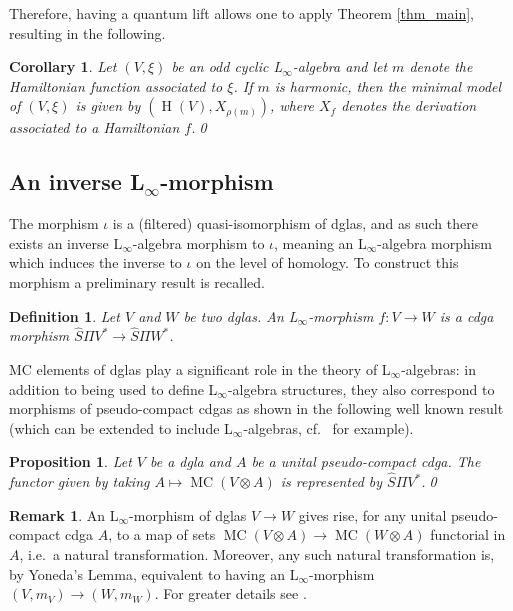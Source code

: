 \documentclass[]{amsart}
\newtheorem{corollary}[theorem]{Corollary}
\newtheorem{proposition}[theorem]{Proposition}
\newtheorem{definition}[theorem]{Definition}
\theoremstyle{definition}
\newtheorem{remark}[theorem]{Remark}
\newcommand{\Linf}{L$_\infty$}
\newcommand{\MC}{\operatorname{MC}}
\newcommand{\homology}{\operatorname{H}}
\begin{document}
Therefore, having a quantum lift allows one to apply Theorem \ref{thm_main}, resulting in the following.

\begin{corollary}
Let $(V,\xi)$ be an odd cyclic \Linf-algebra and let $m$ denote the Hamiltonian function associated to $\xi$. If $m$ is harmonic, then the minimal model of $(V,\xi)$ is given by $(\homology(V), X_{\rho (m)})$, where $X_f$ denotes the derivation associated to a Hamiltonian $f$.\qed
\end{corollary}

\subsection{An inverse \Linf-morphism}

The morphism $\iota$ is a (filtered) quasi-isomorphism of dglas, and as such there exists an inverse \Linf-algebra morphism to $\iota$, meaning an \Linf-algebra morphism which induces the inverse to $\iota$ on the level of homology. To construct this morphism a preliminary result is recalled.

\begin{definition}
Let $V$ and $W$ be two dglas. An \Linf-morphism $f\colon V\to W$ is a cdga morphism $\hat{S}\Pi V^* \to \hat{S}\Pi W^*$.
\end{definition}

MC elements of dglas play a significant role in the theory of \Linf-algebras: in addition to being used to define \Linf-algebra structures, they also correspond to morphisms of pseudo-compact cdgas as shown in the following well known result (which can be extended to include \Linf-algebras, cf.\ \cite{braun_laz_homotopy_BV} for example).

\begin{proposition}\label{prop_rep_functor}
Let $V$ be a dgla and $A$ be a unital pseudo-compact cdga. The functor given by taking $A\mapsto\MC (V\otimes A)$ is represented by $\hat{S}\Pi V^*$.\qed
\end{proposition}

\begin{remark}\label{yoneda}
An \Linf-morphism of dglas $V\to W$ gives rise, for any unital pseudo-compact cdga $A$, to a map of sets $\MC(V\otimes A) \to \MC(W\otimes A)$ functorial in $A$, i.e.\ a natural transformation. Moreover, any such natural transformation is, by Yoneda's Lemma, equivalent to having an \Linf-morphism $(V,m_V)\to(W,m_W)$. For greater details see \cite{chuang_laz}.
\end{remark}
\end{document}
